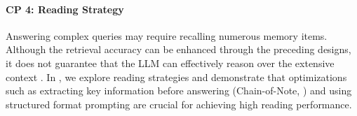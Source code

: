 \paragraph{CP 4: Reading Strategy} Answering complex queries may require recalling numerous memory items. Although the retrieval accuracy can be enhanced through the preceding designs, it does not guarantee that the LLM can effectively reason over the extensive context \citep{DBLP:conf/icml/ShiCMSDCSZ23, DBLP:journals/tacl/LiuLHPBPL24}. In , we explore reading strategies and demonstrate that optimizations such as extracting key information before answering (Chain-of-Note, \citep{yu2023chain}) and using structured format prompting \citep{yin-etal-2023-read} are crucial for achieving high reading performance.



